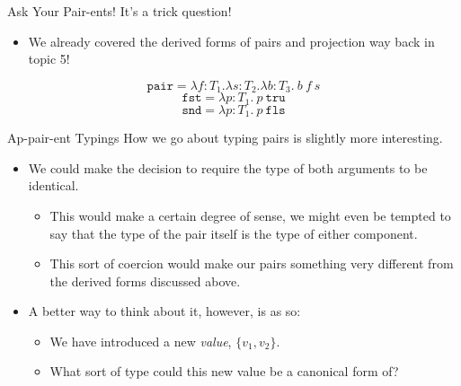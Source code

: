 \documentclass[11pt]{beamer}
\begin{document}
\begin{frame}[fragile=singleslide]{Ask Your Pair-ents!}
It's a trick question! 
\begin{itemize}
\item We already covered the derived forms of pairs and projection way back in topic 5!
\end{itemize}
\begin{equation}
\texttt{pair} = \lambda f : T_1. \lambda s : T_2. \lambda b : T_3.\:b\:f\:s
\end{equation}
\begin{equation}
\texttt{fst} = \lambda p : T_1.\:p\:\texttt{tru} 
\end{equation}
\begin{equation}
\texttt{snd} = \lambda p : T_1.\:p\:\texttt{fls} 
\end{equation}
\end{frame}

\begin{frame}[fragile=singleslide]{Ap-pair-ent Typings}
How we go about typing pairs is slightly more interesting.  
\begin{itemize}
\item We could make the decision to require the type of both arguments to be identical.
\begin{itemize}
\item This would make a certain degree of sense, we might even be tempted to say that the type of the pair itself is the type of either component.
\item This sort of coercion would make our pairs something very different from the derived forms discussed above. 
\end{itemize}
\item A better way to think about it, however, is as so:
\begin{itemize}
\item We have introduced a new \emph{value}, $\{v_1, v_2\}$. 
\item What sort of type could this new value be a canonical form of? 
\end{itemize}
\end{itemize}
\end{frame}
\end{document}
